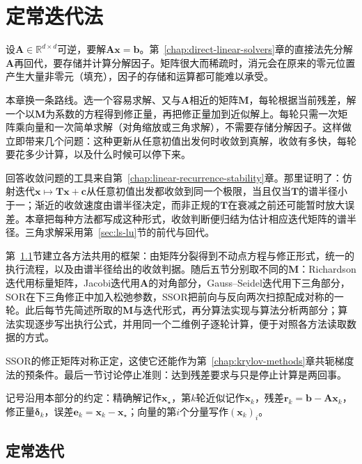 \chapter{定常迭代法}
\label{sec:ls-stationary-iterations}
\label{chap:stationary-iterations}

设$\bm A\in\mathbb R^{d\times d}$可逆，要解$\bm A\bm x=\bm b$。第~\ref{chap:direct-linear-solvers}章的直接法先分解$\bm A$再回代，要存储并计算分解因子。矩阵很大而稀疏时，消元会在原来的零元位置产生大量非零元（填充），因子的存储和运算都可能难以承受。

本章换一条路线。选一个容易求解、又与$\bm A$相近的矩阵$\bm M$，每轮根据当前残差，解一个以$\bm M$为系数的方程得到修正量，再把修正量加到近似解上。每轮只需一次矩阵乘向量和一次简单求解（对角缩放或三角求解），不需要存储分解因子。这样做立即带来几个问题：这种更新从任意初值出发何时收敛到真解，收敛有多快，每轮要花多少计算，以及什么时候可以停下来。

回答收敛问题的工具来自第~\ref{chap:linear-recurrence-stability}章。那里证明了：仿射迭代$\bm x\mapsto\bm T\bm x+\bm c$从任意初值出发都收敛到同一个极限，当且仅当$\bm T$的谱半径小于一；渐近的收敛速度由谱半径决定，而非正规的$\bm T$在衰减之前还可能暂时放大误差。本章把每种方法都写成这种形式，收敛判断便归结为估计相应迭代矩阵的谱半径。三角求解采用第~\ref{sec:ls-lu}节的前代与回代。

第~\ref{sec:ls-matrix-splitting}节建立各方法共用的框架：由矩阵分裂得到不动点方程与修正形式，统一的执行流程，以及由谱半径给出的收敛判据。随后五节分别取不同的$\bm M$：Richardson迭代用标量矩阵，Jacobi迭代用$\bm A$的对角部分，Gauss--Seidel迭代用下三角部分，SOR在下三角修正中加入松弛参数，SSOR把前向与反向两次扫掠配成对称的一轮。此后每节先简述所取的$\bm M$与迭代形式，再分算法实现与算法分析两部分；算法实现逐步写出执行公式，并用同一个二维例子逐轮计算，便于对照各方法读取数据的方式。

SSOR的修正矩阵对称正定，这使它还能作为第~\ref{chap:krylov-methods}章共轭梯度法的预条件。最后一节讨论停止准则：达到残差要求与只是停止计算是两回事。

记号沿用本部分的约定：精确解记作$\bm x_\star$，第$k$轮近似记作$\bm x_k$，残差$\bm r_k=\bm b-\bm A\bm x_k$，修正量$\bm\delta_k$，误差$\bm e_k=\bm x_k-\bm x_\star$；向量的第$i$个分量写作$(\bm x_k)_i$。

\section{定常迭代}
\label{sec:ls-matrix-splitting}

